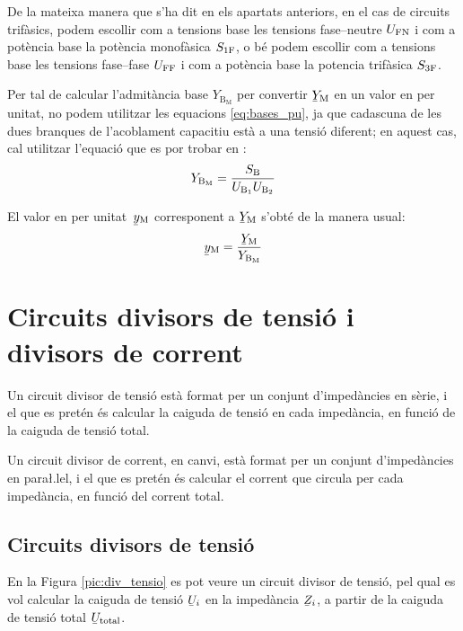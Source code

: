 De la mateixa manera que s'ha dit en els apartats anteriors, en el cas de circuits trif\`{a}sics, podem escollir com a tensions base les tensions fase--neutre $U_\mathrm{FN}$ i com a pot\`{e}ncia base la pot\`{e}ncia  monof\`{a}sica $S_\mathrm{1F}$, o b\'{e} podem escollir com a tensions base les tensions fase--fase $U_\mathrm{FF}$ i com a pot\`{e}ncia base la potencia trif\`{a}sica $S_\mathrm{3F}$.


Per tal de  calcular l'admit\`{a}ncia base $Y_{\text{B}_\text{M}}$ per convertir $\cmplx{Y}\ped{M}$ en un valor en per unitat, no podem utilitzar les equacions \eqref{eq:bases_pu}, ja que cadascuna de les dues branques de l'acoblament capacitiu est\`{a} a una tensi\'{o} diferent; en aquest cas, cal utilitzar l'equaci\'{o} que es por trobar en \cite{TLE}:
\begin{equation}
    Y_{\text{B}_\text{M}} = \frac{S_\mathrm{B}}{U_{\text{B}_1} U_{\text{B}_2}}
\end{equation}

El valor en per unitat\ $\cmplx{y}\ped{M}$ corresponent a $\cmplx{Y}\ped{M}$ s'obt\'{e} de la manera usual:
\begin{equation}
    \cmplx{y}\ped{M} = \frac{\cmplx{Y}\ped{M}}{Y_{\text{B}_\text{M}}}
\end{equation}


\section{Circuits divisors de tensi\'{o} i divisors de corrent}\label{sec:div_tens_corr}

Un circuit divisor de tensi\'{o} est\`{a} format per un conjunt
d'imped\`{a}ncies en s\`{e}rie, i el que es pret\'{e}n \'{e}s calcular la caiguda de
tensi\'{o} en cada imped\`{a}ncia, en funci\'{o} de la caiguda de tensi\'{o} total.

Un circuit divisor de corrent, en canvi, est\`{a} format per un conjunt
d'imped\`{a}ncies en para{\l.l}el, i el que es pret\'{e}n \'{e}s calcular el
corrent que circula per cada imped\`{a}ncia, en funci\'{o} del corrent
total.

\subsection{Circuits divisors de tensi\'{o}}

En la Figura \vref{pic:div_tensio} es pot veure un circuit divisor
de tensi\'{o}, pel qual es vol calcular la caiguda de tensi\'{o}
$\cmplx{U}_i$ en la imped\`{a}ncia $\cmplx{Z}_i$, a partir de la caiguda
de tensi\'{o} total $\cmplx{U}\ped{total}$.

